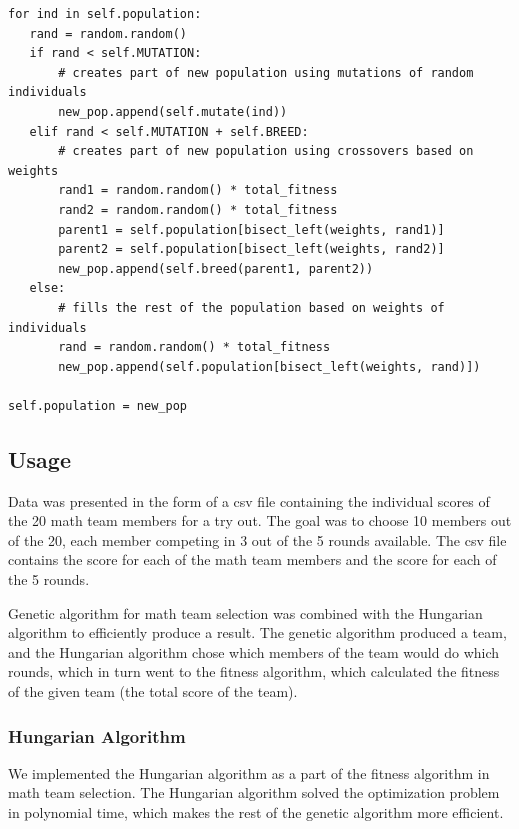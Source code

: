 \documentclass[11pt,a4paper]{article}
\begin{document}
\begin{lstlisting}
for ind in self.population:
   rand = random.random()
   if rand < self.MUTATION:
       # creates part of new population using mutations of random individuals
       new_pop.append(self.mutate(ind))
   elif rand < self.MUTATION + self.BREED:
       # creates part of new population using crossovers based on weights
       rand1 = random.random() * total_fitness
       rand2 = random.random() * total_fitness
       parent1 = self.population[bisect_left(weights, rand1)]
       parent2 = self.population[bisect_left(weights, rand2)]
       new_pop.append(self.breed(parent1, parent2))
   else:
       # fills the rest of the population based on weights of individuals
       rand = random.random() * total_fitness
       new_pop.append(self.population[bisect_left(weights, rand)])

self.population = new_pop
\end{lstlisting}
\subsection{Usage}
\label{Genetic Algorithms:Usage}

Data was presented in the form of a csv file containing the individual scores of the 20 math team members for a try out. The goal was to choose 10 members out of the 20, each member competing in 3 out of the 5 rounds available. The csv file contains the score for each of the math team members and the score for each of the 5 rounds.

Genetic algorithm for math team selection was combined with the Hungarian algorithm to efficiently produce a result. The genetic algorithm produced a team, and the Hungarian algorithm chose which members of the team would do which rounds, which in turn went to the fitness algorithm, which calculated the fitness of the given team (the total score of the team).

\subsubsection{Hungarian Algorithm}
\label{Genetic Algorithms:Hungarian Algorithm}

We implemented the Hungarian algorithm as a part of the fitness algorithm in math team selection. The Hungarian algorithm solved the optimization problem in polynomial time, which makes the rest of the genetic algorithm more efficient.
\end{document}
